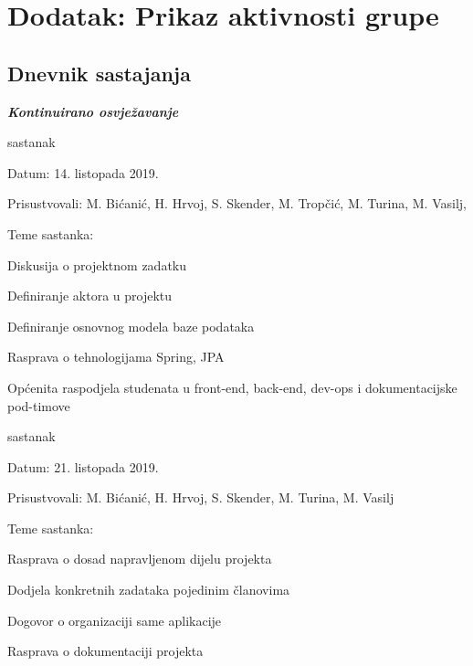 \chapter*{Dodatak: Prikaz aktivnosti grupe}
		
		\section*{Dnevnik sastajanja}
		
		\textbf{\textit{Kontinuirano osvježavanje}}\\
		
		
		\begin{packed_enum}
			\item  sastanak
			
			\item[] \begin{packed_item}
				\item Datum: 14. listopada 2019.
				\item Prisustvovali: M. Bićanić, H. Hrvoj, S. Skender, M. Tropčić, M. Turina, M. Vasilj, 
				\item Teme sastanka:
				\begin{packed_item}
					\item  Diskusija o projektnom zadatku
					\item  Definiranje aktora u projektu
					\item  Definiranje osnovnog modela baze podataka
					\item  Rasprava o tehnologijama Spring, JPA
					\item  Općenita raspodjela studenata u front-end, back-end, dev-ops i dokumentacijske pod-timove
				\end{packed_item}
			\end{packed_item}
			
			\item  sastanak
			\item[] \begin{packed_item}
				\item Datum: 21. listopada 2019.
				\item Prisustvovali: M. Bićanić, H. Hrvoj, S. Skender, M. Turina, M. Vasilj
				\item Teme sastanka:
				\begin{packed_item}
					\item  Rasprava o dosad napravljenom dijelu projekta
					\item  Dodjela konkretnih zadataka pojedinim članovima
					\item  Dogovor o organizaciji same aplikacije
					\item  Rasprava o dokumentaciji projekta
				\end{packed_item}
			\end{packed_item}
		

\end{packed_enum}
